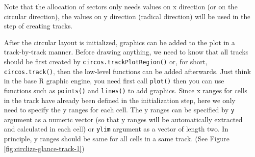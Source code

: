 \documentclass[]{book}
\newenvironment{Shaded}{\begin{snugshade}}{\end{snugshade}}
\newcommand{\KeywordTok}[1]{\textcolor[rgb]{0.13,0.29,0.53}{\textbf{#1}}}
\newcommand{\DataTypeTok}[1]{\textcolor[rgb]{0.13,0.29,0.53}{#1}}
\newcommand{\DecValTok}[1]{\textcolor[rgb]{0.00,0.00,0.81}{#1}}
\newcommand{\FloatTok}[1]{\textcolor[rgb]{0.00,0.00,0.81}{#1}}
\newcommand{\StringTok}[1]{\textcolor[rgb]{0.31,0.60,0.02}{#1}}
\newcommand{\ControlFlowTok}[1]{\textcolor[rgb]{0.13,0.29,0.53}{\textbf{#1}}}
\newcommand{\OperatorTok}[1]{\textcolor[rgb]{0.81,0.36,0.00}{\textbf{#1}}}
\newcommand{\NormalTok}[1]{#1}
\begin{document}
Note that the allocation of sectors only needs values on x direction (or
on the circular direction), the values on y direction (radical
direction) will be used in the step of creating tracks.

After the circular layout is initialized, graphics can be added to the
plot in a track-by-track manner. Before drawing anything, we need to
know that all tracks should be first created by
\texttt{circos.trackPlotRegion()} or, for short,
\texttt{circos.track()}, then the low-level functions can be added
afterwards. Just think in the base R graphic engine, you need first call
\texttt{plot()} then you can use functions such as \texttt{points()} and
\texttt{lines()} to add graphics. Since x ranges for cells in the track
have already been defined in the initialization step, here we only need
to specify the y ranges for each cell. The y ranges can be specified by
\texttt{y} argument as a numeric vector (so that y ranges will be
automatically extracted and calculated in each cell) or \texttt{ylim}
argument as a vector of length two. In principle, y ranges should be
same for all cells in a same track. (See Figure
\ref{fig:circlize-glance-track-1})

\begin{Shaded}
\end{Shaded}
\end{document}
